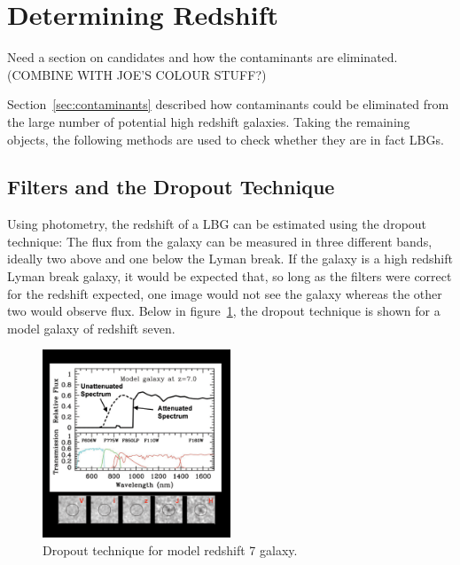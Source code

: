 
\section{Determining Redshift} %
\label{sub:determingin_redshift}
	Need a section on candidates and how the contaminants are eliminated.
	(COMBINE WITH JOE'S COLOUR STUFF?)

	Section~\ref{sec:contaminants} described how contaminants could be eliminated from the large number of potential high redshift galaxies. Taking the remaining objects, the following methods are used to check whether they are in fact LBGs.

	\subsection{Filters and the Dropout Technique} %
		\label{ssub:filters_and_the_dropout_technique}
		Using photometry, the redshift of a LBG can be estimated using the dropout technique: The flux from the galaxy can be measured in three different bands, ideally two above and one below the Lyman break. If the galaxy is a high redshift Lyman break galaxy, it would be expected that, so long as the filters were correct for the redshift expected, one image would not see the galaxy whereas the other two would observe flux. Below in figure~\ref{fig:drop_out_at_z7}, the dropout technique is shown for a model galaxy of redshift seven.
		\begin{figure}[ht]
			\centering
			\includegraphics[width=0.5\textwidth]{../Images/drop_out_at_z7.png}
			\caption{Dropout technique for model redshift 7 galaxy\cite{first_galaxies_dropout_at_z7}.\label{fig:drop_out_at_z7}}
		\end{figure}


